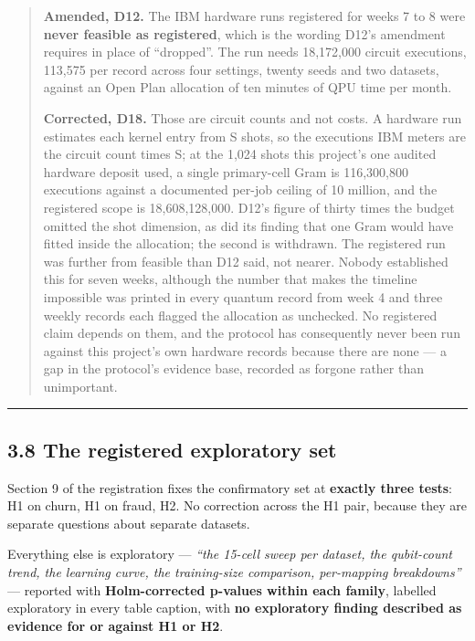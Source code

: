 \documentclass[
  10pt,
]{article}
\newcounter{none} %
\begin{document}
\begin{quote}
\textbf{Amended, D12.} The IBM hardware runs registered for weeks 7 to 8
were \textbf{never feasible as registered}, which is the wording D12's
amendment requires in place of ``dropped''. The run needs 18,172,000
circuit executions, 113,575 per record across four settings, twenty
seeds and two datasets, against an Open Plan allocation of ten minutes
of QPU time per month.

\textbf{Corrected, D18.} Those are circuit counts and not costs. A
hardware run estimates each kernel entry from S shots, so the executions
IBM meters are the circuit count times S; at the 1,024 shots this
project's one audited hardware deposit used, a single primary-cell Gram
is 116,300,800 executions against a documented per-job ceiling of 10
million, and the registered scope is 18,608,128,000. D12's figure of
thirty times the budget omitted the shot dimension, as did its finding
that one Gram would have fitted inside the allocation; the second is
withdrawn. The registered run was further from feasible than D12 said,
not nearer. Nobody established this for seven weeks, although the number
that makes the timeline impossible was printed in every quantum record
from week 4 and three weekly records each flagged the allocation as
unchecked. No registered claim depends on them, and the protocol has
consequently never been run against this project's own hardware records
because there are none --- a gap in the protocol's evidence base,
recorded as forgone rather than unimportant.
\end{quote}

\begin{center}\rule{0.5\linewidth}{0.5pt}\end{center}

\subsection{3.8 The registered exploratory
set}\label{the-registered-exploratory-set}

Section 9 of the registration fixes the confirmatory set at
\textbf{exactly three tests}: H1 on churn, H1 on fraud, H2. No
correction across the H1 pair, because they are separate questions about
separate datasets.

Everything else is exploratory --- \emph{``the 15-cell sweep per
dataset, the qubit-count trend, the learning curve, the training-size
comparison, per-mapping breakdowns''} --- reported with
\textbf{Holm-corrected p-values within each family}, labelled
exploratory in every table caption, with \textbf{no exploratory finding
described as evidence for or against H1 or H2}.
\end{document}
